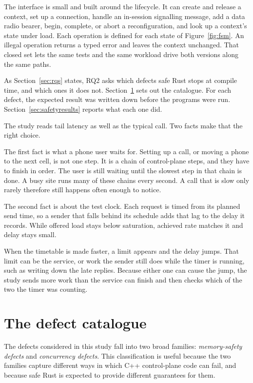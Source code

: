\documentclass[english,oneside,a4paper,censored,csm,software-track-2020]{HYthesisML}
\begin{document}
The interface is small and built around the lifecycle. It can create and
release a context, set up a connection, handle an in-session signalling
message, add a data radio bearer, begin, complete, or abort a
reconfiguration, and look up a context's state under load. Each
operation is defined for each state of Figure~\ref{fig:fsm}. An illegal operation
returns a typed error and leaves the context unchanged. That closed set lets
the same tests and the same workload drive both versions along the same
paths.

As Section~\ref{sec:rqs} states, RQ2 asks which defects safe Rust stops at compile
time, and which ones it does not. Section~\ref{sec:defects} sets out the catalogue. For each defect, the expected
result was written down before the programs were run.
Section~\ref{sec:safetyresults} reports what each one did.

The study reads tail latency as well as the typical call. Two facts make that the right
choice.

The first fact is what a phone user waits for. Setting up a call, or moving a phone to the
next cell, is not one step. It is a chain of control-plane steps, and they have to finish in
order. The user is still waiting until the slowest step in that chain is done. A busy site
runs many of these chains every second. A call that is slow only rarely therefore still
happens often enough to notice.

The second fact is about the test clock. Each request is timed from its planned send time, so
a sender that falls behind its schedule adds that lag to the delay it records. While offered
load stays below saturation, achieved rate matches it and delay stays small.

When the timetable is made faster, a limit appears and the delay jumps. That limit can
be the service, or work the sender still does while the timer is running, such as writing
down the late replies. Because either one can cause the jump, the study sends more work
than the service can finish and then checks which of the two the timer was counting.

\section{The defect catalogue}\label{sec:defects}
The defects considered in this study fall into two broad families:
\emph{memory-safety defects} and \emph{concurrency defects}. This
classification is useful because the two families capture different ways in
which C++ control-plane code can fail, and because safe Rust is expected to
provide different guarantees for them.
\end{document}
